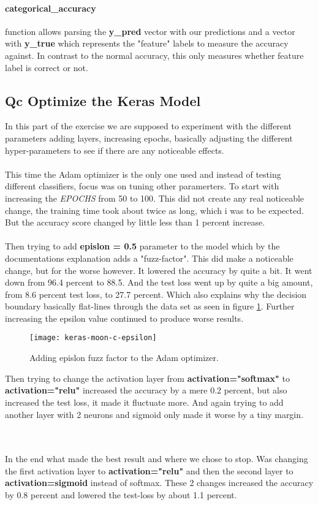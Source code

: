 \documentclass{article}
\begin{document}
\newline
\paragraph{categorical\_accuracy} function allows parsing the \textbf{y\_pred} vector with our predictions and a vector with \textbf{y\_true} which represents the "feature" labels to measure the accuracy against. In contrast to the normal accuracy, this only measures whether feature label is correct or not.

\subsection{Qc Optimize the Keras Model}
In this part of the exercise we are supposed to experiment with the different parameters adding layers, increasing epochs, basically adjusting the different hyper-parameters to see if there are any noticeable effects.
\\ \\
This time the Adam optimizer is the only one used and instead of testing different classifiers, focus was on tuning other paramerters. To start with increasing the \textit{EPOCHS} from 50 to 100.
This did not create any real noticeable change, the training time took about twice as long, which i was to be expected. But the accuracy score changed by little less than 1 percent increase.
\\ \\
Then trying to add \textbf{epislon = 0.5} parameter to the model which by the documentations explanation adds a "fuzz-factor". This did make a noticeable change, but for the worse however. It lowered the accuracy by quite a bit. It went down from 96.4 percent to 88.5. And the test loss went up by quite a big amount, from 8.6 percent test loss, to 27.7 percent. Which also explains why the decision boundary basically flat-lines through the data set as seen in figure \ref{fig:keras-moon-c-epsilon}. Further increasing the epsilon value continued to produce worse results.

\begin{figure}[H]
  \centering
    \texttt{[image: keras-moon-c-epsilon]}
    \caption{Adding epislon fuzz factor to the Adam optimizer.}
    \label{fig:keras-moon-c-epsilon}
\end{figure}
\noindent
Then trying to change the activation layer from \textbf{activation="softmax"} to \textbf{activation="relu"} increased the accuracy by a mere 0.2 percent, but also increased the test loss, it made it fluctuate more. And again trying to add another layer with 2 neurons and sigmoid only made it worse by a tiny margin.

\\ \\ In the end what made the best result and where we chose to stop. Was changing the first activation layer to \textbf{activation="relu"} and then the second layer to \textbf{activation=sigmoid} instead of softmax. These 2 changes increased the accuracy by 0.8 percent and lowered the test-loss by about 1.1 percent.
\end{document}
